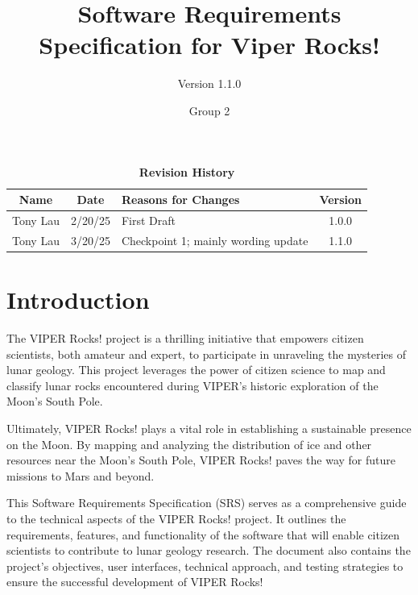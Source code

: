 \documentclass{article}
\begin{document}
\title{Software Requirements Specification for Viper Rocks!}
\author{Version 1.1.0}
\date{Group 2}

\maketitle
\tableofcontents
\newpage

\fancyhf{}
\fancyfoot[C]{\thepage}

\begin{table}[h!]
\centering
\caption{\textbf{Revision History}}
\begin{tabularx}{\textwidth}{|c|c|X|c|}
\hline
\textbf{Name} & \textbf{Date} & \textbf{Reasons for Changes} & \textbf{Version} \\
\hline
Tony Lau & 2/20/25 & First Draft & 1.0.0 \\
\hline
Tony Lau & 3/20/25 & Checkpoint 1; mainly wording update & 1.1.0 \\
\hline

\hline

\hline
\end{tabularx}
\end{table}

\section{Introduction}
The VIPER Rocks! project is a thrilling initiative that empowers citizen scientists, both amateur and expert, to participate in unraveling the mysteries of lunar geology. This project leverages the power of citizen science to map and classify lunar rocks encountered during VIPER's historic exploration of the Moon's South Pole.

Ultimately, VIPER Rocks! plays a vital role in establishing a sustainable presence on the Moon. By mapping and analyzing the distribution of ice and other resources near the Moon's South Pole, VIPER Rocks! paves the way for future missions to Mars and beyond.

This Software Requirements Specification (SRS) serves as a comprehensive guide to the technical aspects of the VIPER Rocks! project. It outlines the requirements, features, and functionality of the software that will enable citizen scientists to contribute to lunar geology research. The document also contains the project's objectives, user interfaces, technical approach, and testing strategies to ensure the successful development of VIPER Rocks!
\end{document}
